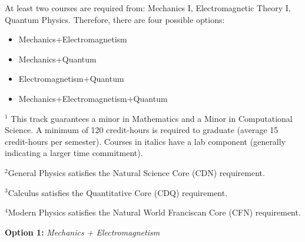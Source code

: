 \documentclass[12pt]{article}
\begin{document}
At least two courses are required from:  Mechanics I, Electromagnetic Theory I, Quantum Physics. Therefore, there are four possible options: 
\begin{itemize}
\item Mechanics+Electromagnetism
\item Mechanics+Quantum
\item Electromagnetism+Quantum
\item Mechanics+Electromagnetism+Quantum
\end{itemize}



\vspace*{1cm}
\hspace{0.1in}$^{1}$ This track guarantees a minor in Mathematics and a Minor in Computational Science. \hspace*{0.42in} A minimum of 120 credit-hours is required to graduate (average 15 credit-hours per semester).  \hspace*{0.42in}Courses in italics have a lab
component (generally indicating a larger time commitment). 

\hspace{0.1in}$^{2}$General Physics satisfies the Natural Science Core (CDN) requirement.

\hspace{0.1in}$^{3}$Calculus satisfies the Quantitative Core (CDQ) requirement.

\hspace{0.1in}$^{4}$Modern Physics satisfies the Natural World Franciscan Core
(CFN) requirement.


\newpage

\begin{center}
{ \Large \textbf {Option 1:} {\em Mechanics + Electromagnetism}}
\end{center}
\end{document}
